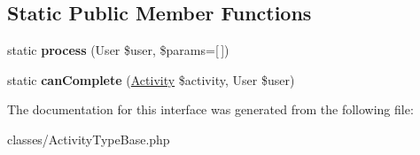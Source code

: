 \subsection*{Static Public Member Functions}
\begin{DoxyCompactItemize}
\item 
\hypertarget{interfaceDMA_1_1Friends_1_1Classes_1_1ActivityTypeBaseInterface_a8dcb0d18509be65ebe67050af33d8e45}{}static {\bfseries process} (User \$user, \$params=\mbox{[}$\,$\mbox{]})\label{interfaceDMA_1_1Friends_1_1Classes_1_1ActivityTypeBaseInterface_a8dcb0d18509be65ebe67050af33d8e45}

\item 
\hypertarget{interfaceDMA_1_1Friends_1_1Classes_1_1ActivityTypeBaseInterface_aa0f6efc901514a0383f98a4fe3aa12be}{}static {\bfseries can\+Complete} (\hyperlink{classDMA_1_1Friends_1_1Models_1_1Activity}{Activity} \$activity, User \$user)\label{interfaceDMA_1_1Friends_1_1Classes_1_1ActivityTypeBaseInterface_aa0f6efc901514a0383f98a4fe3aa12be}

\end{DoxyCompactItemize}


The documentation for this interface was generated from the following file\+:\begin{DoxyCompactItemize}
\item 
classes/Activity\+Type\+Base.\+php\end{DoxyCompactItemize}
